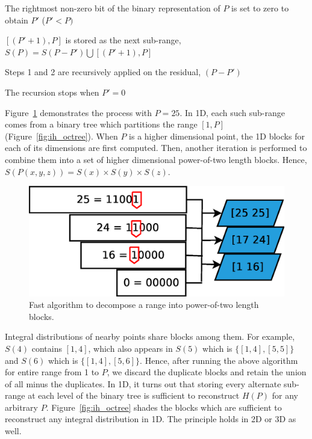 \begin{packed_enumerate}
\item The rightmost non-zero bit of the binary representation of $P$ is set to zero to obtain $P'$ ($P'<P)$
\item $[(P'+1),P]$ is stored as the next sub-range, $S(P) = S(P-P') \bigcup [(P'+1),P]$
\item Steps 1 and 2 are recursively applied on the residual, $(P-P')$
\item The recursion stops when $P'=0$
\end{packed_enumerate}
Figure~\ref{fig:ih_dcomp_algo} demonstrates the process with $P=25$. In 1D, each such sub-range comes from a binary tree which partitions the range $[1,P]$ (Figure~\ref{fig:ih_octree}). When $P$ is a higher dimensional point, the 1D blocks for each of its dimensions are first computed. Then, another iteration is performed to combine them into a set of higher dimensional power-of-two length blocks. Hence, $S(P(x,y,z)) = S(x)\times S(y)\times S(z)$.
\begin{figure}
\centering
	\includegraphics[width = \linewidth, keepaspectratio = true]{images/eps/decomp_algo.eps}
	\caption{Fast algorithm to decompose a range into power-of-two length blocks.}	
	\label{fig:ih_dcomp_algo}
\end{figure}

Integral distributions of nearby points share blocks among them. For example, $S(4)$ contains $[1,4]$, which also appears in $S(5)$ which is $\{[1,4],[5,5]\}$ and $S(6)$ which is $\{[1,4],[5,6]\}$. Hence, after running the above algorithm for entire range from 1 to $P$, we discard the duplicate blocks and retain the union of all minus the duplicates. In 1D, it turns out that storing every alternate sub-range at each level of the binary tree is sufficient to reconstruct $H(P)$ for any arbitrary $P$. Figure~\ref{fig:ih_octree} shades the blocks which are sufficient to reconstruct any integral distribution in 1D. The principle holds in 2D or 3D as well. 

